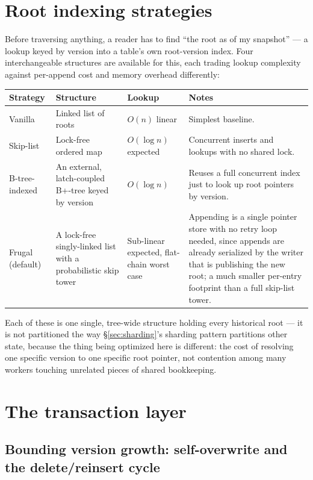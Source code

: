 \documentclass[11pt]{article}
\begin{document}
\section{Root indexing strategies}
\label{sec:root}

Before traversing anything, a reader has to find ``the root as of my snapshot'' ---
a lookup keyed by version into a table's own root-version index. Four
interchangeable structures are available for this, each trading lookup complexity
against per-append cost and memory overhead differently:

\begin{center}
\begin{tabular}{@{}p{2.6cm}p{4.4cm}p{2.9cm}p{4.0cm}@{}}
\toprule
\textbf{Strategy} & \textbf{Structure} & \textbf{Lookup} & \textbf{Notes} \\
\midrule
Vanilla & Linked list of roots & $O(n)$ linear & Simplest baseline. \\
Skip-list & Lock-free ordered map & $O(\log n)$ expected & Concurrent inserts and
  lookups with no shared lock. \\
B-tree-indexed & An external, latch-coupled B+-tree keyed by version & $O(\log n)$
  & Reuses a full concurrent index just to look up root pointers by version. \\
Frugal (default) & A lock-free singly-linked list with a probabilistic skip
  tower & Sub-linear expected, flat-chain worst case & Appending is a single
  pointer store with no retry loop needed, since appends are already serialized by
  the writer that is publishing the new root; a much smaller per-entry footprint
  than a full skip-list tower. \\
\bottomrule
\end{tabular}
\end{center}

Each of these is one single, tree-wide structure holding every historical root --- it
is not partitioned the way \S\ref{sec:sharding}'s sharding pattern partitions other
state, because the thing being optimized here is different: the cost of resolving
one specific version to one specific root pointer, not contention among many workers
touching unrelated pieces of shared bookkeeping.

\section{The transaction layer}
\label{sec:tx}

\subsection{Bounding version growth: self-overwrite and the delete/reinsert cycle}
\label{sec:selfoverwrite}
\end{document}
